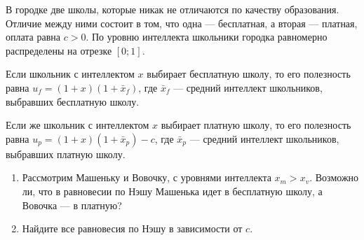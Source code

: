 \begin{problem}
\begin{enumerate}
\end{enumerate}


\begin{sol}

\end{sol}
\end{problem}




\begin{problem}
В городке две школы, которые никак не отличаются по качеству образования. Отличие между ними состоит в том, что одна --- бесплатная, а вторая --- платная, оплата равна $c>0$. По уровню интеллекта школьники городка равномерно распределены на отрезке $[0;1]$. \par
Если школьник с интеллектом $x$ выбирает бесплатную школу, то его полезность равна $u_{f}=(1+x)(1+\bar{x}_{f})$, где $\bar{x}_{f}$ --- средний интеллект школьников, выбравших бесплатную школу. \par
Если же школьник с интеллектом $x$ выбирает платную школу, то его полезность равна $u_{p}=(1+x)(1+\bar{x}_{p})-c$, где $\bar{x}_{p}$ --- средний интеллект школьников, выбравших платную школу. \par
\begin{enumerate}
\item Рассмотрим Машеньку и Вовочку, с уровнями интеллекта $x_{m}>x_{v}$. Возможно ли, что в равновесии по Нэшу Машенька идет в бесплатную школу, а Вовочка --- в платную? \par
\item Найдите все равновесия по Нэшу в зависимости от $c$.
\end{enumerate}



\end{problem}
